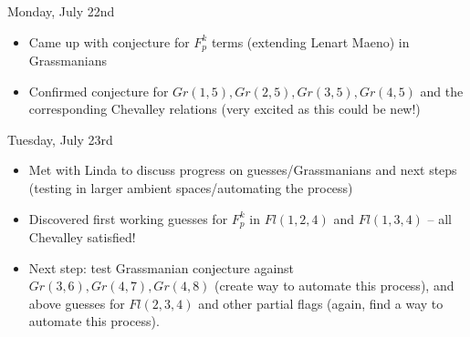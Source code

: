 Monday, July 22nd
\begin{itemize}
    \item Came up with conjecture for $F_p^k$ terms (extending Lenart Maeno) in Grassmanians
    \item Confirmed conjecture for $Gr(1, 5), Gr(2, 5), Gr(3, 5), Gr(4, 5)$ and the corresponding Chevalley relations (very excited as this could be new!)
\end{itemize}

Tuesday, July 23rd
\begin{itemize}
    \item Met with Linda to discuss progress on guesses/Grassmanians and next steps (testing in larger ambient spaces/automating the process)
    \item Discovered first working guesses for $F_p^k$ in $Fl(1, 2, 4)$ and $Fl(1, 3, 4)$ -- all Chevalley satisfied!
    \item Next step: test Grassmanian conjecture against $Gr(3, 6), Gr(4, 7), Gr(4, 8)$ (create way to automate this process), and above guesses for $Fl(2, 3, 4)$ and other partial flags (again, find a way to automate this process).
\end{itemize}

